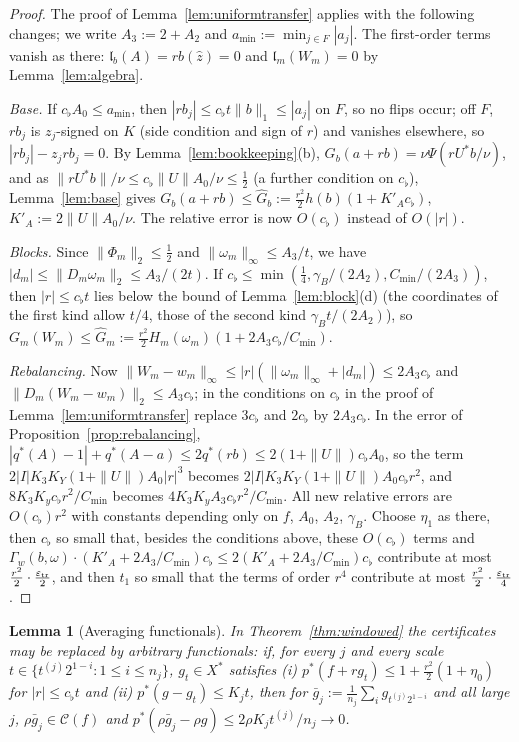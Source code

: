 \documentclass[10pt]{amsart}
\newtheorem{lemma}[theorem]{Lemma}
\theoremstyle{definition}
\theoremstyle{remark}
\newcommand{\Cset}{\mathcal C}
\newcommand{\zh}{\hat z}
\newcommand{\lin}{\mathfrak l}
\begin{document}
\begin{proof}
The proof of Lemma~\ref{lem:uniformtransfer} applies with the following
changes; we write $A_3:=2+A_2$ and $a_{\min}:=\min_{j\in F}|a_j|$.  The
first-order terms vanish as there: $\lin_b(A)=rb(\zh)=0$ and
$\lin_m(W_m)=0$ by Lemma~\ref{lem:algebra}.

\emph{Base.}  If $c_\flat A_0\le a_{\min}$, then $|rb_j|\le c_\flat t\|b\|_1
\le|a_j|$ on $F$, so no flips occur; off $F$, $rb_j$ is $z_j$-signed on $K$
(side condition and sign of $r$) and vanishes elsewhere, so
$|rb_j|-z_jrb_j=0$.  By Lemma~\ref{lem:bookkeeping}(b),
$G_b(a+rb)=\nu\Psi(rU^*b/\nu)$, and as $\|rU^*b\|/\nu\le c_\flat\|U\|A_0/\nu
\le\frac12$ (a further condition on $c_\flat$), Lemma~\ref{lem:base} gives
$G_b(a+rb)\le\hat G_b:=\frac{r^2}2h(b)(1+K'_Ac_\flat)$, $K'_A:=2\|U\|A_0/\nu$.
The relative error is now $O(c_\flat)$ instead of $O(|r|)$.

\emph{Blocks.}  Since $\|\Phi_m\|_2\le\frac12$ and $\|\omega_m\|_\infty\le
A_3/t$, we have $|d_m|\le\|D_m\omega_m\|_2\le A_3/(2t)$.  If $c_\flat\le
\min(\frac14,\gamma_B/(2A_2),C_{\min}/(2A_3))$, then $|r|\le c_\flat t$ lies
below the bound of Lemma~\ref{lem:block}(d) (the coordinates of the first
kind allow $t/4$, those of the second kind $\gamma_Bt/(2A_2)$), so
$G_m(W_m)\le\hat G_m:=\frac{r^2}2H_m(\omega_m)(1+2A_3c_\flat/C_{\min})$.

\emph{Rebalancing.}  Now $\|W_m-w_m\|_\infty\le|r|(\|\omega_m\|_\infty+|d_m|)
\le2A_3c_\flat$ and $\|D_m(W_m-w_m)\|_2\le A_3c_\flat$; in the conditions on
$c_\flat$ in the proof of Lemma~\ref{lem:uniformtransfer} replace $3c_\flat$
and $2c_\flat$ by $2A_3c_\flat$.  In the error of
Proposition~\ref{prop:rebalancing}, $|q^*(A)-1|+q^*(A-a)\le2q^*(rb)\le
2(1+\|U\|)c_\flat A_0$, so the term
$2|I|K_3K_Y(1+\|U\|)A_0|r|^3$ becomes $2|I|K_3K_Y(1+\|U\|)A_0c_\flat r^2$,
and $8K_3K_yc_\flat r^2/C_{\min}$ becomes $4K_3K_yA_3c_\flat r^2/C_{\min}$.
All new relative errors are $O(c_\flat)r^2$ with constants depending only on
$f$, $A_0$, $A_2$, $\gamma_B$.  Choose $\eta_1$ as there, then $c_\flat$ so
small that, besides the conditions above, these $O(c_\flat)$ terms and
$\Gamma_w(b,\omega)\cdot(K'_A+2A_3/C_{\min})c_\flat\le2(K'_A+2A_3/C_{\min})
c_\flat$ contribute at most $\frac{r^2}2\cdot\frac{\varepsilon_{\rm tr}}2$,
and then $t_1$ so small that the terms of order $r^4$ contribute at most
$\frac{r^2}2\cdot\frac{\varepsilon_{\rm tr}}4$.
\end{proof}

\begin{lemma}[Averaging functionals]\label{lem:avgfunctionals}
In Theorem~\ref{thm:windowed} the certificates may be replaced by
arbitrary functionals: if, for every $j$ and every scale
$t\in\{t^{(j)}2^{1-i}:1\le i\le n_j\}$, $g_t\in X^*$ satisfies
\textup{(i)} $p^*(f+rg_t)\le1+\frac{r^2}2(1+\eta_0)$ for $|r|\le c_\flat t$
and \textup{(ii)} $p^*(g-g_t)\le K_jt$, then for $\bar g_j:=\frac1{n_j}
\sum_ig_{t^{(j)}2^{1-i}}$ and all large $j$, $\rho\bar g_j\in\Cset(f)$ and
$p^*(\rho\bar g_j-\rho g)\le2\rho K_jt^{(j)}/n_j\to0$.
\end{lemma}
\end{document}
